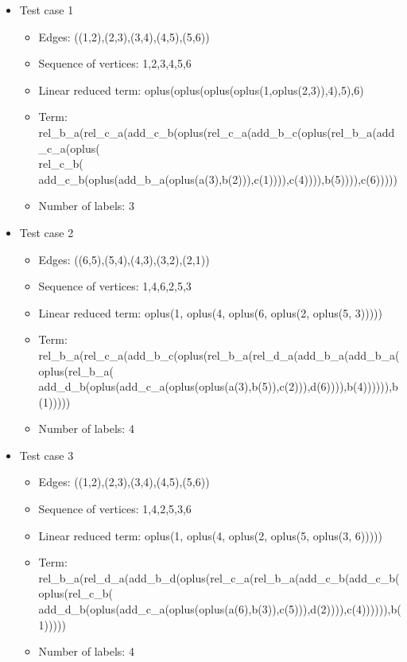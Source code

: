 \documentclass[a4paper, 12pt]{article}
\begin{document}
\begin{itemize}

\item Test case 1
	\begin{itemize}
		\item Edges: ((1,2),(2,3),(3,4),(4,5),(5,6))
		\item Sequence of vertices: 1,2,3,4,5,6
		\item Linear reduced term: oplus(oplus(oplus(oplus(1,oplus(2,3)),4),5),6)
		\item Term: rel\_b\_a(rel\_c\_a(add\_c\_b(oplus(rel\_c\_a(add\_b\_c(oplus(rel\_b\_a(add\_c\_a(oplus( \\
rel\_c\_b( add\_c\_b(oplus(add\_b\_a(oplus(a(3),b(2))),c(1)))),c(4)))),b(5)))),c(6)))))
		\item Number of labels: 3
	\end{itemize}

\item Test case 2
	\begin{itemize}
		\item Edges: ((6,5),(5,4),(4,3),(3,2),(2,1))
		\item Sequence of vertices: 1,4,6,2,5,3
		\item Linear reduced term: oplus(1, oplus(4, oplus(6, oplus(2, oplus(5, 3)))))
		\item Term: rel\_b\_a(rel\_c\_a(add\_b\_c(oplus(rel\_b\_a(rel\_d\_a(add\_b\_a(add\_b\_a(oplus(rel\_b\_a( \\
add\_d\_b(oplus(add\_c\_a(oplus(oplus(a(3),b(5)),c(2))),d(6)))),b(4)))))),b(1))))) 
		\item Number of labels: 4
	\end{itemize}

\item Test case 3
	\begin{itemize}
		\item Edges: ((1,2),(2,3),(3,4),(4,5),(5,6))		
		\item Sequence of vertices: 1,4,2,5,3,6
		\item Linear reduced term: oplus(1, oplus(4, oplus(2, oplus(5, oplus(3, 6)))))
		\item Term: rel\_b\_a(rel\_d\_a(add\_b\_d(oplus(rel\_c\_a(rel\_b\_a(add\_c\_b(add\_c\_b(oplus(rel\_c\_b( \\
add\_d\_b(oplus(add\_c\_a(oplus(oplus(a(6),b(3)),c(5))),d(2)))),c(4)))))),b(1)))))
		\item Number of labels: 4
	\end{itemize}


\end{itemize}
\end{document}
